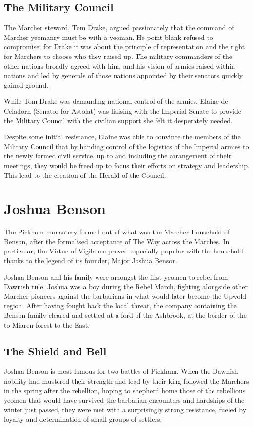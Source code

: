 \subsection{The Military Council}
The Marcher steward, Tom Drake, argued passionately that the command of Marcher yeomanry must be with a yeoman. He point blank refused to compromise; for Drake it was about the principle of representation and the right for Marchers to choose who they raised up. The military commanders of the other nations broadly agreed with him, and his vision of armies raised within nations and led by generals of those nations appointed by their senators quickly gained ground.

While Tom Drake was demanding national control of the armies, Elaine de Celadorn (Senator for Astolat) was liaising with the Imperial Senate to provide the Military Council with the civilian support she felt it desperately needed.

Despite some initial resistance, Elaine was able to convince the members of the Military Council that by handing control of the logistics of the Imperial armies to the newly formed civil service, up to and including the arrangement of their meetings, they would be freed up to focus their efforts on strategy and leadership. This lead to the creation of the Herald of the Council.
\section{Joshua Benson}
The Pickham monastery
formed out of what was
the Marcher Household of
Benson, after the formalised
acceptance of The Way across the
Marches. In particular, the Virtue of
Vigilance proved especially popular
with the household thanks to the
legend of its founder, Major Joshua
Benson.

Joshua Benson and his
family were amongst the first
yeomen to rebel from Dawnish rule.
Joshua was a boy during the Rebel
March, fighting alongside other
Marcher pioneers against the
barbarians in what would later
become the Upwold region. After
having fought back the local threat,
the company containing the Benson
family cleared and settled at a ford of
the Ashbrook, at the border of the to
Miaren forest to the East.
\subsection{The Shield and Bell}
Joshua Benson is most famous
for two battles of Pickham.
When the Dawnish nobility
had mustered their strength and lead
by their king followed the Marchers
in the spring after the rebellion,
hoping to shepherd home those of
the rebellious yeomen that would
have survived the barbarian
encounters and hardships of the
winter just passed, they were met
with a surprisingly strong
resistance, fueled by loyalty and
determination of small groups of
settlers.

